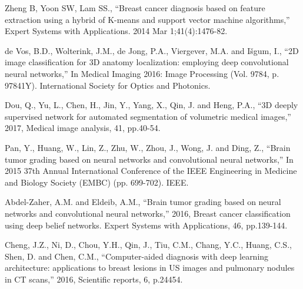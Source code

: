 \documentclass[conference]{IEEEtran}
\begin{document}
\begin{thebibliography}{00}
% 
 Zheng B, Yoon SW, Lam SS., ``Breast cancer diagnosis based on feature extraction using a hybrid of K-means and support vector machine algorithms,'' Expert Systems with Applications. 2014 Mar 1;41(4):1476-82.



 de Vos, B.D., Wolterink, J.M., de Jong, P.A., Viergever, M.A. and Išgum, I., ``2D image classification for 3D anatomy localization: employing deep convolutional neural networks,'' In Medical Imaging 2016: Image Processing (Vol. 9784, p. 97841Y). International Society for Optics and Photonics.


 Dou, Q., Yu, L., Chen, H., Jin, Y., Yang, X., Qin, J. and Heng, P.A., ``3D deeply supervised network for automated segmentation of volumetric medical images,''  2017, Medical image analysis, 41, pp.40-54.

 Pan, Y., Huang, W., Lin, Z., Zhu, W., Zhou, J., Wong, J. and Ding, Z., ``Brain tumor grading based on neural networks and convolutional neural networks,'' In 2015 37th Annual International Conference of the IEEE Engineering in Medicine and Biology Society (EMBC) (pp. 699-702). IEEE.



 Abdel-Zaher, A.M. and Eldeib, A.M., ``Brain tumor grading based on neural networks and convolutional neural networks,'' 2016, Breast cancer classification using deep belief networks. Expert Systems with Applications, 46, pp.139-144.


 Cheng, J.Z., Ni, D., Chou, Y.H., Qin, J., Tiu, C.M., Chang, Y.C., Huang, C.S., Shen, D. and Chen, C.M., ``Computer-aided diagnosis with deep learning architecture: applications to breast lesions in US images and pulmonary nodules in CT scans,'' 2016, Scientific reports, 6, p.24454.


\end{thebibliography}
\end{document}
